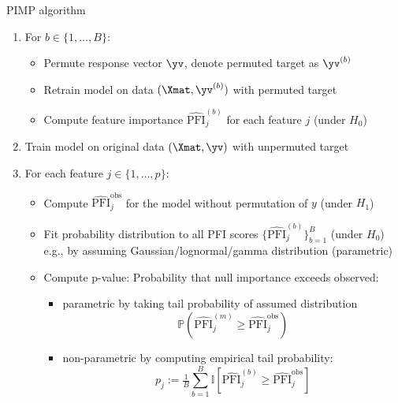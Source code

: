 \documentclass[11pt,compress,t,notes=noshow, aspectratio=169, xcolor=table]{beamer}
\begin{document}
\begin{frame}{PIMP algorithm}

\begin{enumerate}
	\item<1-3> For $b \in \{1, \ldots, B\}$:
		\begin{itemize}
			\item Permute response vector $\yv$, denote permuted target as $\yv^{(b)}$
			\item Retrain model on data $(\Xmat, \yv^{(b)})$ with permuted target 
			\item Compute feature importance $\widehat{\text{PFI}}_j^{(b)}$ for each feature $j$ (under $H_0$)
		\end{itemize}
	\item<2-3> Train model on original data  $(\Xmat, \yv)$ with unpermuted target
	\item<3> For each feature $j \in \{1,\ldots,p\}$:
		\begin{itemize}
        		\item Compute $\widehat{\text{PFI}}_j^{\text{obs}}$ for the model without permutation of $y$ (under $H_1$)
			\item Fit probability distribution to all PFI scores $\{\widehat{\text{PFI}}_j^{(b)}\}_{b=1}^{B}$ (under $H_0$)\\
            e.g., by assuming Gaussian/lognormal/gamma distribution (parametric)%
			\item Compute p-value: Probability that null importance exceeds observed: 
            \begin{itemize}
                \item parametric by taking tail probability of assumed distribution $$\mathbb{P}(\widehat{\text{PFI}}_j^{(m)} \geq \widehat{\text{PFI}}_j^{\text{obs}})$$
                \item non-parametric by computing empirical tail probability: 
                $$p_j := \tfrac{1}{B} \textstyle \sum_{b=1}^{B} \mathbb{I}[\widehat{\text{PFI}}_j^{(b)} \geq \widehat{\text{PFI}}_j^{\text{obs}}]$$
            \end{itemize}

		\end{itemize}
\end{enumerate}
\end{frame}
\end{document}
